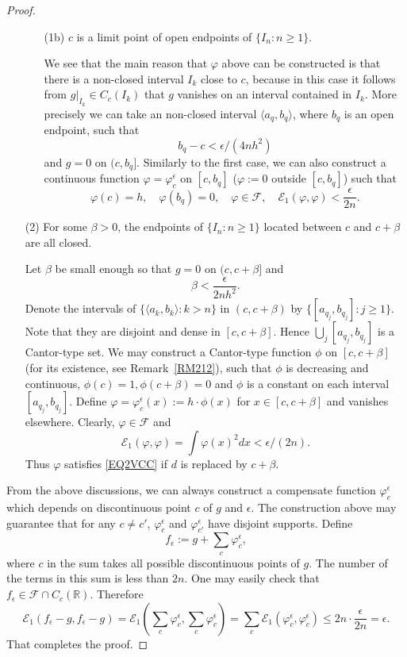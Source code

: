 \documentclass[a4paper]{amsart}
\theoremstyle{definition}
\theoremstyle{remark}
\numberwithin{equation}{section}
\begin{document}
\begin{proof}
\begin{itemize}
\begin{itemize}
\item[(1b)] $c$ is a limit point of open endpoints of $\{I_n:n\ge 1\}$.

We see that the main reason that $\varphi$ above can be constructed is that there is a non-closed interval $I_k$ close to $c$,
because in this case it follows from $g|_{I_k}\in C_c(I_k)$ that $g$ vanishes on an interval contained in $I_k$.
More precisely we can take an non-closed interval $\langle a_q, b_q\rangle $, where $b_q$ is an open endpoint, such that
\[
b_q-c<\epsilon/(4nh^2)
\]
and $g=0$ on $(c,b_q]$. Similarly to the first case, we can also construct a continuous function $\varphi=\varphi_c^\epsilon$ on $[c,b_q]$ ($\varphi:=0$ outside $[c,b_q]$) such that
\[
	\varphi(c)=h, \quad  \varphi(b_q)=0,\quad \varphi \in {{\mathcal{F}}},\quad {{\mathcal{E}}}_1(\varphi, \varphi)<\frac{\epsilon}{2n}.
\]
\end{itemize}

\item[(2)] For some $\beta>0$, the endpoints of $\{I_n:n\ge1\}$ located between $c$ and $c+\beta$ are all closed.

Let $\beta$ be small enough so that $g=0$ on $(c, c+\beta]$ and $$\beta<\frac{\epsilon}{2nh^2}.$$
Denote the intervals of $\{\langle a_k,b_k\rangle: k>n\}$ in $(c, c+\beta)$ by $\{[a_{q_j},b_{q_j}]: j\geq 1\}$. Note that they are disjoint and dense in $[c,c+\beta]$. Hence $\bigcup_j [a_{q_j},b_{q_j}]$ is a Cantor-type set. We may construct a Cantor-type function $\phi$ on $[c,c+\beta]$ (for its existence, see Remark~\ref{RM212}), such that $\phi$ is decreasing and continuous, $\phi(c)=1, \phi(c+\beta)=0$ and $\phi$ is a constant on each interval $[a_{q_j}, b_{q_j}]$. Define $\varphi=\varphi_c^\epsilon(x):=h\cdot \phi(x)$ for $x\in [c, c+\beta]$ and vanishes elsewhere. Clearly, $\varphi\in {{\mathcal{F}}}$ and $${{\mathcal{E}}}_1(\varphi,\varphi)=\int\varphi(x)^2dx<\epsilon/(2n).$$ Thus $\varphi$ satisfies \eqref{EQ2VCC} if $d$ is replaced by $c+\beta$.
\end{itemize}

From the above discussions, we can always construct a compensate function $\varphi_c^\epsilon$ which depends on discontinuous point $c$ of $g$ and $\epsilon$. The construction above may guarantee that for any $c\neq c'$, $\varphi_c^\epsilon$ and $\varphi_{c'}^\epsilon$ have disjoint supports.  Define
\[
	f_\epsilon:=g+\sum_{c} \varphi_c^\epsilon,
\]
where $c$ in the sum takes all possible discontinuous points of $g$. The number of the terms in this sum is less than $2n$. One may easily check that $f_\epsilon \in {{\mathcal{F}}}\cap C_c(\mathbb{R})$. Therefore
\[
	{{\mathcal{E}}}_1(f_\epsilon-g,f_\epsilon-g)={{\mathcal{E}}}_1\left(\sum_c\varphi_c^\epsilon, \sum_c\varphi_c^\epsilon\right)
=\sum_c{{\mathcal{E}}}_1(\varphi_c^\epsilon,\varphi_c^\epsilon) \leq 2n\cdot \frac{\epsilon}{2n}=\epsilon.
\]
That completes the proof.
\end{proof}
\end{document}
